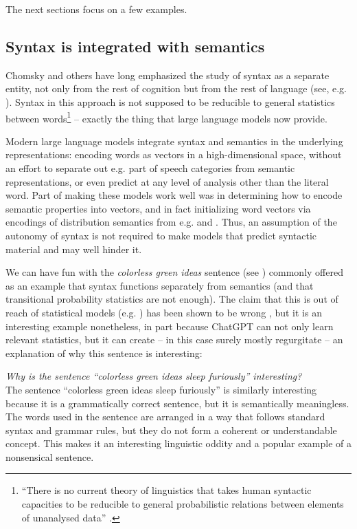\documentclass[output=paper,colorlinks,citecolor=brown
]{langscibook}
\begin{document}
The next sections focus on a few examples. 

\subsection{Syntax is integrated with semantics}
Chomsky and others have long emphasized the study of syntax as a separate entity, not only from the rest of cognition but from the rest of language (see, e.g. \citealt{chomsky1957syntactic,croft1995autonomy,newmeyer1991functional,adger2018autonomy}). Syntax in this approach is not supposed to be reducible to general statistics between words\footnote{``There is no current theory of linguistics
that takes human syntactic capacities to be reducible to general probabilistic relations between elements of unanalysed data'' \citep{adger2018autonomy}.} -- exactly the thing that large language models now provide. 

Modern large language models integrate syntax and semantics in the underlying representations:
encoding words as vectors in a high-dimensional space, without an effort to separate out e.g. part
of speech categories from semantic representations, or even predict at any level of analysis other
than the literal word. Part of making these models work well was in determining how to encode
semantic properties into vectors, and in fact initializing word vectors via encodings of
distribution semantics from e.g. \citet{mikolov2013distributed} and \citet{radford2019language}. Thus, an assumption of the autonomy of syntax is not required to make models that predict syntactic material and may well hinder it. 

We can have fun with the \textit{colorless green ideas} sentence (see \citealt{gulordava2018colorless}) commonly offered as an example that syntax functions separately from semantics (and that transitional probability statistics are not enough). The claim that this is out of reach of statistical models (e.g. \citealt{chomsky1957syntactic}) has been shown to be wrong \citep{pereira2000formal,norvig2012colorless,gulordava2018colorless}, but it is an interesting example nonetheless, in part because ChatGPT can not only learn relevant statistics, but it can create -- in this case surely mostly regurgitate -- an explanation of why this sentence is interesting:

\begin{myquote}
\textit{Why is the sentence ``colorless green ideas sleep furiously'' interesting?}\medskip\\
\noindent The sentence ``colorless green ideas sleep furiously'' is similarly interesting because it is a grammatically correct sentence, but it is semantically meaningless. The words used in the sentence are arranged in a way that follows standard syntax and grammar rules, but they do not form a coherent or understandable concept. This makes it an interesting linguistic oddity and a popular example of a nonsensical sentence.
\end{myquote}
\end{document}
